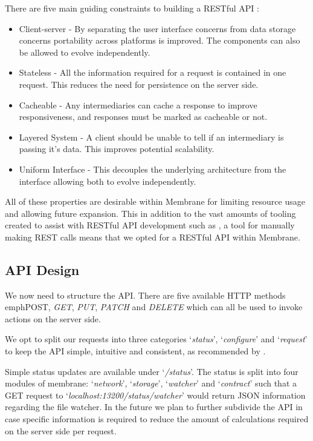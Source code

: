 \documentclass[11pt, a4paper, twocolumn, twoside]{report}
\begin{document}
There are five main guiding constraints to building a RESTful API \citep{fielding2000architectural}: 

\begin{itemize}
 \item Client-server - By separating the user interface concerns from data storage concerns portability across platforms is improved. The components can also be allowed to evolve independently.
 \item Stateless - All the information required for a request is contained in one request. This reduces the need for persistence on the server side.
 \item Cacheable - Any intermediaries can cache a response to improve responsiveness, and responses must be marked as cacheable or not.
 \item Layered System - A client should be unable to tell if an intermediary is passing it's data. This improves potential scalability.
 \item Uniform Interface - This decouples the underlying architecture from the interface allowing both to evolve independently.
\end{itemize}

All of these properties are desirable within Membrane for limiting resource usage and allowing future expansion. This in addition to the vast amounts of tooling created to assist with RESTful API development such as \cite{postman2017api}, a tool for manually making REST calls means that we opted for a RESTful API within Membrane.

\subsection{API Design}

We now need to structure the API. There are five available HTTP methods emph{POST}, \emph{GET}, \emph{PUT}, \emph{PATCH} and \emph{DELETE} which can all be used to invoke actions on the server side.

We opt to split our requests into three categories `\emph{status}', `\emph{configure}' and `\emph{request}' to keep the API simple, intuitive and consistent, as recommended by \cite{google2017api}.

Simple status updates are available under `\emph{/status}'. The status is split into four modules of membrane: `\emph{network}', `\emph{storage}', `\emph{watcher}' and `\emph{contract}' such that a GET request to `\emph{localhost:13200/status/watcher}' would return JSON information regarding the file watcher. In the future we plan to further subdivide the API in case specific information is required to reduce the amount of calculations required on the server side per request.
\end{document}
